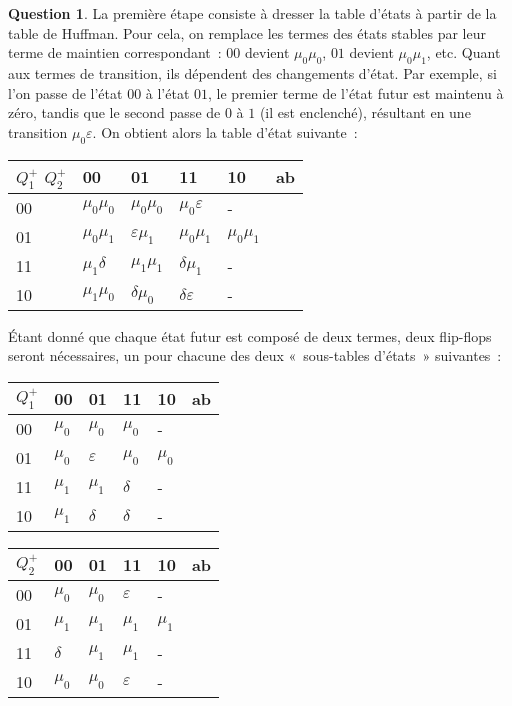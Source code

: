 \documentclass[11pt,a4paper]{article}
\theoremstyle{definition}%
\newtheorem{Q}{Question}[] %
\begin{document}
\begin{Q}
{		La première étape consiste à dresser la table d'états à partir de la table de Huffman.
		Pour cela, on remplace les termes des états stables par leur terme de maintien correspondant~: $00$ devient $\mu_0\mu_0$, $01$ devient $\mu_0\mu_1$, etc.
		Quant aux termes de transition, ils dépendent des changements d'état. Par exemple, si l'on passe de l'état $00$ à l'état $01$, le premier terme de l'état futur est maintenu à zéro, tandis que le second passe de $0$ à $1$ (il est enclenché), résultant en une transition $\mu_0\varepsilon$.
		On obtient alors la table d'état suivante~:
		\begin{center}
			\begin{tabular}{|l|l|l|l|l|l} \hline
			$Q^+_1$ $Q^+_2$ & 00         & 01         & 11         & 10         & \multicolumn{1}{l|}{ab} \\ \hline
			00           & $\mu_0\mu_0$ & $\mu_0\mu_0$ & $\mu_0\varepsilon$ & - & \\ \cline{1-5}
			01           & $\mu_0\mu_1$ & $\varepsilon\mu_1$ & $\mu_0\mu_1$ & $\mu_0\mu_1$ & \\ \cline{1-5}
			11           & $\mu_1\delta$ & $\mu_1\mu_1$ & $\delta\mu_1$ & - & \\ \cline{1-5}
			10           & $\mu_1\mu_0$ & $\delta\mu_0$ & $\delta\varepsilon$ & - & \\ \cline{1-5}
			\end{tabular}
		\end{center}

		Étant donné que chaque état futur est composé de deux termes, deux flip-flops seront nécessaires, un pour chacune des deux «~sous-tables d'états~» suivantes~:
		\begin{center}
			\begin{tabular}{|l|l|l|l|l|l} \hline
			$Q^+_1$ & 00         & 01         & 11         & 10         & \multicolumn{1}{l|}{ab} \\ \hline
			00           & $\mu_0$ & $\mu_0$ & $\mu_0$ & - & \\ \cline{1-5}
			01           & $\mu_0$ & $\varepsilon$ & $\mu_0$ & $\mu_0$ & \\ \cline{1-5}
			11           & $\mu_1$ & $\mu_1$ & $\delta$ & - & \\ \cline{1-5}
			10           & $\mu_1$ & $\delta$ & $\delta$ & - & \\ \cline{1-5}
			\end{tabular}
			\begin{tabular}{|l|l|l|l|l|l} \hline
			$Q^+_2$ & 00         & 01         & 11         & 10         & \multicolumn{1}{l|}{ab} \\ \hline
			00           & $\mu_0$ & $\mu_0$ & $\varepsilon$ & - & \\ \cline{1-5}
			01           & $\mu_1$ & $\mu_1$ & $\mu_1$ & $\mu_1$ & \\ \cline{1-5}
			11           & $\delta$ & $\mu_1$ & $\mu_1$ & - & \\ \cline{1-5}
			10           & $\mu_0$ & $\mu_0$ & $\varepsilon$ & - & \\ \cline{1-5}
			\end{tabular}
		\end{center}


}
\end{Q}
\end{document}

